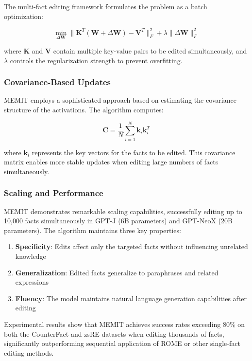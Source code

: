 The multi-fact editing framework formulates the problem as a batch optimization:

\begin{equation}
\min_{\Delta\mathbf{W}} \|\mathbf{K}^T(\mathbf{W} + \Delta\mathbf{W}) - \mathbf{V}^T\|_F^2 + \lambda\|\Delta\mathbf{W}\|_F^2
\end{equation}

where $\mathbf{K}$ and $\mathbf{V}$ contain multiple key-value pairs to be edited simultaneously, and $\lambda$ controls the regularization strength to prevent overfitting.

\subsubsection{Covariance-Based Updates}

MEMIT employs a sophisticated approach based on estimating the covariance structure of the activations. The algorithm computes:

\begin{equation}
\mathbf{C} = \frac{1}{N}\sum_{i=1}^{N}\mathbf{k}_i\mathbf{k}_i^T
\end{equation}

where $\mathbf{k}_i$ represents the key vectors for the facts to be edited. This covariance matrix enables more stable updates when editing large numbers of facts simultaneously.

\subsubsection{Scaling and Performance}

MEMIT demonstrates remarkable scaling capabilities, successfully editing up to 10,000 facts simultaneously in GPT-J (6B parameters) and GPT-NeoX (20B parameters). The algorithm maintains three key properties:

\begin{enumerate}
    \item \textbf{Specificity}: Edits affect only the targeted facts without influencing unrelated knowledge
    \item \textbf{Generalization}: Edited facts generalize to paraphrases and related expressions
    \item \textbf{Fluency}: The model maintains natural language generation capabilities after editing
\end{enumerate}

Experimental results show that MEMIT achieves success rates exceeding 80\% on both the CounterFact and zsRE datasets when editing thousands of facts, significantly outperforming sequential application of ROME or other single-fact editing methods.

